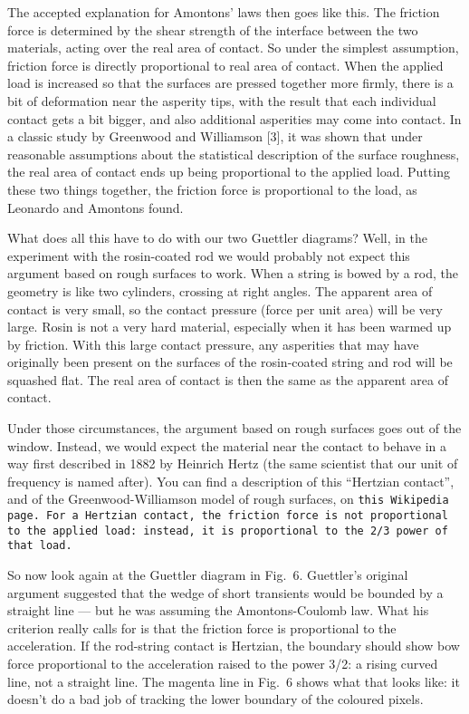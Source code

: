   The accepted explanation for Amontons’ laws then goes like this. The friction 
  force is determined by the shear strength of the interface between the two 
  materials, acting over the real area of contact. So under the simplest 
  assumption, friction force is directly proportional to real area of contact. 
  When the applied load is increased so that the surfaces are pressed together 
  more firmly, there is a bit of deformation near the asperity tips, with the 
  result that each individual contact gets a bit bigger, and also additional 
  asperities may come into contact. In a classic study by Greenwood and 
  Williamson [3], it was shown that under reasonable assumptions about the 
  statistical description of the surface roughness, the real area of contact 
  ends up being proportional to the applied load. Putting these two things 
  together, the friction force is proportional to the load, as Leonardo and 
  Amontons found. 

  What does all this have to do with our two Guettler diagrams? Well, in the 
  experiment with the rosin-coated rod we would probably not expect this 
  argument based on rough surfaces to work. When a string is bowed by a rod, 
  the geometry is like two cylinders, crossing at right angles. The apparent 
  area of contact is very small, so the contact pressure (force per unit area) 
  will be very large. Rosin is not a very hard material, especially when it has 
  been warmed up by friction. With this large contact pressure, any asperities 
  that may have originally been present on the surfaces of the rosin-coated 
  string and rod will be squashed flat. The real area of contact is then the 
  same as the apparent area of contact. 

  Under those circumstances, the argument based on rough surfaces goes out of 
  the window. Instead, we would expect the material near the contact to behave 
  in a way first described in 1882 by Heinrich Hertz (the same scientist that 
  our unit of frequency is named after). You can find a description of this 
  “Hertzian contact”, and of the Greenwood-Williamson model of rough surfaces, 
  on \tt{}this Wikipedia page\rm{}. For a Hertzian contact, 
  the friction force is not proportional to the applied load: instead, it is 
  proportional to the 2/3 power of that load. 

  So now look again at the Guettler diagram in Fig.\ 6. Guettler’s original 
  argument suggested that the wedge of short transients would be bounded by a 
  straight line — but he was assuming the Amontons-Coulomb law. What his 
  criterion really calls for is that the friction force is proportional to the 
  acceleration. If the rod-string contact is Hertzian, the boundary should show 
  bow force proportional to the acceleration raised to the power 3/2: a rising 
  curved line, not a straight line. The magenta line in Fig.\ 6 shows what that 
  looks like: it doesn’t do a bad job of tracking the lower boundary of the 
  coloured pixels. 

